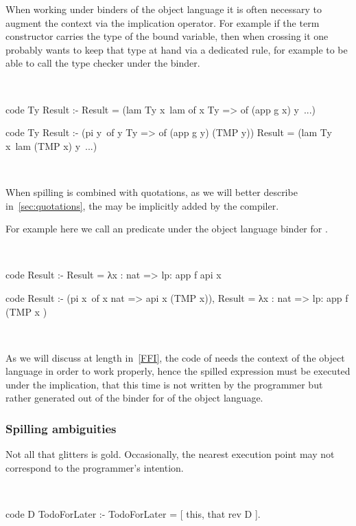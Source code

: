 \documentclass[a4paper, 11pt]{book}
\newenvironment{elpicode}
  {\VerbatimEnvironment~\\\begin{elpibox}\begin{xelpicode}}{\end{xelpicode}
\end{elpibox}\\}
\begin{document}
When working under binders of the object language it is often
necessary to augment the context via
the implication operator. For example if the 
term constructor carries the type of the bound variable, then when
crossing it one probably wants to keep that type at hand via
a dedicated rule, for example to be able to call the type
checker under the binder.

\begin{elpicode}
  code Ty Result :- 
    Result = (lam Ty x\ lam {of x Ty => of (app g x)} y\ ...)

  code Ty Result :-
    (pi y\ of y Ty => of (app g y) (TMP y))
    Result = (lam Ty x\ lam (TMP x) y\ ...)
\end{elpicode}

\noindent
When spilling is combined with quotations, as we
will better describe in~\cref{sec:quotations},
the \elpi{=>} may be implicitly added by the compiler.

For example
here we call an predicate  under the object language binder
for .

\begin{elpicode}
  code Result :-
    Result = {{ λx : nat => lp:{{ app f {api x}  }}  }}

  code Result :-
    (pi x\ of x {{ nat }} => api x (TMP x)),
    Result = {{ λx : nat => lp:{{ app f (TMP {{ x }})  }}  }}
\end{elpicode}

\noindent
As we will discuss at length in~\cref{FFI}, the code of  needs the
context of the object language in order to work properly, hence the
spilled expression must be executed under the implication, that this time
is not written by the programmer but rather generated out of the binder
for  of the object language.

\subsubsection{Spilling ambiguities}

Not all that glitters is gold. Occasionally, the nearest execution point may not
correspond to the programmer's intention.

\begin{elpicode}
  code D TodoForLater  :-
    TodoForLater = [ this, that {rev D} ].
\end{elpicode}
\end{document}
